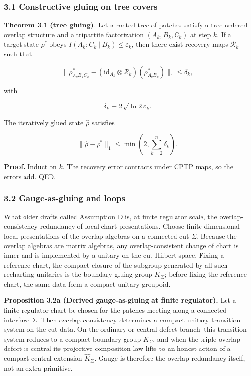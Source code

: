 \subsubsection{3.1 Constructive gluing on tree covers}\label{31-constructive-gluing-on-tree-covers}

\textbf{Theorem 3.1 (tree gluing).} Let a rooted tree of patches satisfy a tree-ordered overlap structure and a tripartite factorization \((A_k, B_k, C_k)\) at step \(k\). If a target state \(\rho^{\ast}\) obeys \(I(A_k:C_k \mid B_k) \le \varepsilon_k\), then there exist recovery maps \(\mathcal{R}_k\) such that

\[
\| \rho^{\ast}_{A_k B_k C_k} - (\mathrm{id}_{A_k} \otimes \mathcal{R}_k)(\rho^{\ast}_{A_k B_k}) \|_1
\le \delta_k,
\]

with

\[
\delta_k = 2 \sqrt{\ln 2\, \varepsilon_k}.
\]

The iteratively glued state \(\hat{\rho}\) satisfies

\[
\| \hat{\rho} - \rho^{\ast} \|_1 \le \min\left(2, \sum_{k=2}^n \delta_k\right).
\]

\textbf{Proof.} Induct on \(k\). The recovery error contracts under CPTP maps, so the errors add. QED.

\subsubsection{3.2 Gauge-as-gluing and loops}\label{32-gauge-as-gluing-and-loops}

What older drafts called Assumption D is, at finite regulator scale, the overlap-consistency redundancy of local chart presentations. Choose finite-dimensional local presentations of the overlap algebras on a connected cut \(\Sigma\). Because the overlap algebras are matrix algebras, any overlap-consistent change of chart is inner and is implemented by a unitary on the cut Hilbert space. Fixing a reference chart, the compact closure of the subgroup generated by all such recharting unitaries is the boundary gluing group \(K_\Sigma\); before fixing the reference chart, the same data form a compact unitary groupoid.

\textbf{Proposition 3.2a (Derived gauge-as-gluing at finite regulator).} Let a finite regulator chart be chosen for the patches meeting along a connected interface \(\Sigma\). Then overlap consistency determines a compact unitary transition system on the cut data. On the ordinary or central-defect branch, this transition system reduces to a compact boundary group \(K_\Sigma\), and when the triple-overlap defect is central its projective composition law lifts to an honest action of a compact central extension \(\widehat K_\Sigma\). Gauge is therefore the overlap redundancy itself, not an extra primitive.

